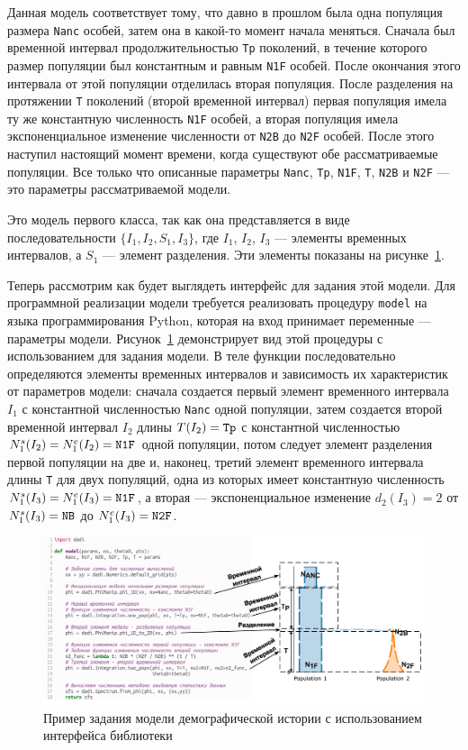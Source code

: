 Данная модель соответствует тому, что давно в прошлом была одна популяция размера \texttt{Nanc} особей, затем она в какой-то момент начала меняться.
Сначала был временной интервал продолжительностью \texttt{Tp} поколений, в течение которого размер популяции был константным и равным \texttt{N1F} особей.
После окончания этого интервала от этой популяции отделилась вторая популяция.
После разделения на протяжении \texttt{T} поколений (второй временной интервал) первая популяция имела ту же константную численность \texttt{N1F} особей, а вторая популяция имела экспоненциальное изменение численности от \texttt{N2B} до \texttt{N2F} особей.
После этого наступил настоящий момент времени, когда существуют обе рассматриваемые популяции.
Все только что описанные параметры \texttt{Nanc}, \texttt{Tp}, \texttt{N1F}, \texttt{T}, \texttt{N2B} и \texttt{N2F} --- это параметры рассматриваемой модели.

Это модель первого класса, так как она представляется в виде последовательности $\{I_1, I_2, S_1, I_3\}$, где $I_1$, $I_2$, $I_3$ --- элементы временных интервалов, а $S_1$ --- элемент разделения.
Эти элементы показаны на рисунке~\ref{fig:dadi:model_spec}.

Теперь рассмотрим как будет выглядеть интерфейс \dadi для задания этой модели.
Для программной реализации модели требуется реализовать процедуру \texttt{model} на языка программирования Python, которая на вход принимает переменные --- параметры модели.
Рисунок~\ref{fig:dadi:model_spec} демонстрирует вид этой процедуры с использованием \dadi для задания модели.
В теле функции последовательно определяются элементы временных интервалов и зависимость их характеристик от параметров модели: сначала создается первый элемент временного интервала $I_1$ с константной численностью \texttt{Nanc} одной популяции, затем создается второй временной интервал $I_2$ длины $T(I_2) = \text{\texttt{Tp}}$ с константной численностью $N_1^s(I_2) = N_1^e(I_2) = \text{\texttt{N1F}}$ одной популяции, потом следует элемент разделения первой популяции на две и, наконец, третий элемент временного интервала длины \texttt{T} для двух популяций, одна из которых имеет константную численность $N_1^s(I_3) = N_1^e(I_3) = \text{\texttt{N1F}}$, а вторая --- экспоненциальное изменение $d_2(I_3) = 2$ от $N_1^s(I_3) = \text{\texttt{NB}}$ до $N_1^e(I_3) = \text{\texttt{N2F}}$.

\begin{figure}[ht]
    \centering
    \includegraphics[width=\linewidth]{images_2/dadi_model.pdf}
    \caption{Пример задания модели демографической истории с использованием интерфейса библиотеки~\dadi}
    \label{fig:dadi:model_spec}
\end{figure}

